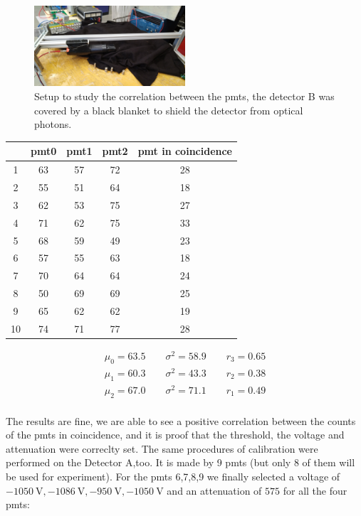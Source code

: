 \documentclass[10pt,a4paper]{article}
\begin{document}
\begin{figure}[hbtp]
\centering
\includegraphics[width = 0.5\textwidth]{figures/IMG_20221107_152816.jpg} 
\caption{Setup to study the correlation between the pmts, the detector B was covered by a black blanket to shield the detector from optical photons.}
\end{figure}
\begin{center}
\begin{tabular}{|c|c|c|c|c|}
\hline 
 & pmt0 & pmt1 & pmt2 & pmt in coincidence \\ 
\hline 
1 & 63 & 57 & 72 & 28 \\ 
\hline 
2 & 55 & 51 & 64 & 18 \\ 
\hline 
3 & 62 & 53 & 75 & 27 \\ 
\hline 
4 & 71 & 62 & 75 & 33 \\ 
\hline 
5 & 68 & 59 & 49 & 23 \\ 
\hline 
6 & 57 & 55 & 63 & 18 \\ 
\hline 
7 & 70 & 64 & 64 & 24 \\ 
\hline 
8 & 50 & 69 & 69 & 25 \\ 
\hline 
9 & 65 & 62 & 62 & 19 \\ 
\hline 
10 & 74 & 71 & 77 & 28 \\ 
\hline 

\end{tabular} 
\end{center}

\begin{equation*}
\begin{split}
\mu_{0} = 63.5 \qquad \sigma^{2} = 58.9 \qquad r_{3} = 0.65 \\
\mu_{1} = 60.3 \qquad \sigma^{2} = 43.3 \qquad r_{2} = 0.38 \\
\mu_{2} = 67.0 \qquad \sigma^{2} = 71.1 \qquad r_{1} = 0.49 \\
\end{split}
\end{equation*}

The results are fine, we are able to see a positive correlation between the counts of the pmts in coincidence, and it is proof that the threshold, the voltage and attenuation were correclty set.
The same procedures of calibration were performed on the Detector A,too. It is made by 9 pmts (but only 8 of them will be used for experiment). For the pmts 6,7,8,9 we finally selected a voltage of $\SI{-1050}{\volt}, \SI{-1086}{\volt}, \SI{-950}{\volt}, \SI{-1050}{\volt} $ and an attenuation of $575$ for all the four pmts:
\end{document}
